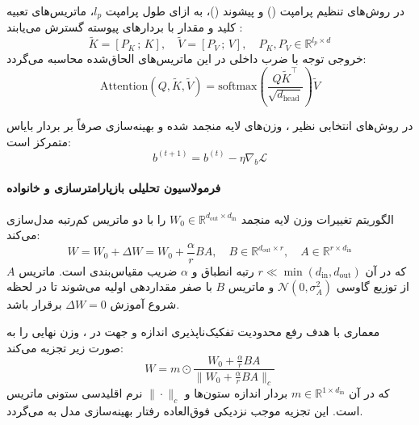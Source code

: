 در روش‌های تنظیم پرامپت () و پیشوند ()، به ازای طول پرامپت $l_p$، ماتریس‌های تعبیه کلید و مقدار با بردارهای پیوسته گسترش می‌یابند \cite{li2021prefix, lester2021power}:
\begin{equation}
    \tilde{K} = [P_K \,;\, K], \quad \tilde{V} = [P_V \,;\, V], \quad P_K, P_V \in \mathbb{R}^{l_p \times d}
\end{equation}
خروجی توجه با ضرب داخلی در این ماتریس‌های الحاق‌شده محاسبه می‌گردد:
\begin{equation}
    \text{Attention}(Q, \tilde{K}, \tilde{V}) = \text{softmax}\left( \frac{Q \tilde{K}^\top}{\sqrt{d_{\text{head}}}} \right) \tilde{V}
\end{equation}

در روش‌های انتخابی نظیر  \cite{ben-zaken-etal-2022-bitfit}، وزن‌های لایه منجمد شده و بهینه‌سازی صرفاً بر بردار بایاس متمرکز است:
\begin{equation}
    b^{(t+1)} = b^{(t)} - \eta \nabla_b \mathcal{L}
\end{equation}

\paragraph*{فرمولاسیون تحلیلی بازپارامترسازی و خانواده }
الگوریتم  \cite{hu2022lora} تغییرات وزن لایه منجمد $W_0 \in \mathbb{R}^{d_{\text{out}} \times d_{\text{in}}}$ را با دو ماتریس کم‌رتبه مدل‌سازی می‌کند:
\begin{equation}
    W = W_0 + \Delta W = W_0 + \frac{\alpha}{r} B A, \quad B \in \mathbb{R}^{d_{\text{out}} \times r}, \quad A \in \mathbb{R}^{r \times d_{\text{in}}}
\end{equation}
که در آن $r \ll \min(d_{\text{in}}, d_{\text{out}})$ رتبه انطباق و $\alpha$ ضریب مقیاس‌بندی است. ماتریس $A$ از توزیع گاوسی $\mathcal{N}(0, \sigma_A^2)$ و ماتریس $B$ با صفر مقداردهی اولیه می‌شوند تا در لحظه شروع آموزش $\Delta W = 0$ برقرار باشد.

معماری  \cite{liu2024dora} با هدف رفع محدودیت تفکیک‌ناپذیری اندازه و جهت در ، وزن نهایی را به صورت زیر تجزیه می‌کند:
\begin{equation}
    W = m \odot \frac{W_0 + \frac{\alpha}{r}BA}{\|W_0 + \frac{\alpha}{r}BA\|_c}
\end{equation}
که در آن $m \in \mathbb{R}^{1 \times d_{\text{in}}}$ بردار اندازه ستون‌ها و $\|\cdot\|_c$ نرم اقلیدسی ستونی ماتریس است. این تجزیه موجب نزدیکی فوق‌العاده رفتار بهینه‌سازی مدل به  می‌گردد.

